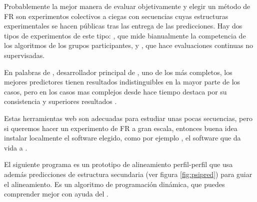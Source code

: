 Probablemente la mejor manera de evaluar objetivamente y elegir un m\'{e}todo de FR 
son experimentos colectivos a ciegas con secuencias cuyas estructuras experimentales se hacen p\'{u}blicas
tras las entrega de las predicciones. Hay dos tipos de experimentos de este tipo: 
, 
que mide bianualmente la competencia de los algoritmos de los grupos participantes, y 
, que hace evaluaciones continuas no supervisadas.

En palabras de \citet{Kelley2015}, desarrollador principal de 
, uno de los m\'{a}s completos,
los mejores predictores tienen resultados indistinguibles en la mayor parte de los casos,
pero en los casos mas complejos desde hace tiempo destaca por su consistencia y 
superiores resultados .


Estas herramientas web son adecuadas para estudiar unas pocas secuencias, pero si queremos hacer un experimento de FR 
a gran escala, entonces buena idea instalar localmente el software elegido, como por ejemplo
, el software que da vida a 
.

El siguiente programa es un prototipo de alineamiento perfil-perfil que usa adem\'{a}s predicciones de estructura secundaria (ver figura \ref{fig:psipred}) 
para guiar el alineamiento. Es un algoritmo de programaci\'{o}n din\'{a}mica, que puedes comprender mejor con ayuda 
del  \citep{Ibarra2010}.

